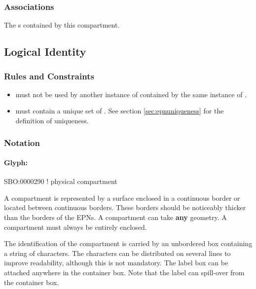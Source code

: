 \subsubsection{Associations}

\begin{attributes}
   The
  s contained by this compartment.
\end{attributes}

\subsection{Logical Identity}

\begin{logicalkey}
  \item {}
  \item {}
\end{logicalkey}

\subsubsection{Rules and Constraints}

\begin{itemize}
\item {} must not be used by another instance of
   contained by the same instance of
  .
\item {} must contain a unique set of
  . See section \ref{sec:epnuniqueness} for
  the definition of  uniqueness.
\end{itemize}

\subsubsection{Notation}

\paragraph{Glyph: }\label{sec:compartment}

\begin{glyphDescription}

\glyphSboTerm  SBO:0000290 ! physical compartment 

\glyphContainer A compartment is represented by a surface enclosed in a continuous border or located between continuous borders. These borders should be noticeably thicker than the borders of the EPNs. A compartment can take \textbf{any} geometry. A compartment must always be entirely enclosed.

\glyphLabel The identification of the compartment is carried by an unbordered box containing a string of characters. The characters can be distributed on several lines to improve readability, although this is not mandatory. The label box can be attached anywhere in the container box. Note that the label can spill-over from the container box.

\end{glyphDescription}

